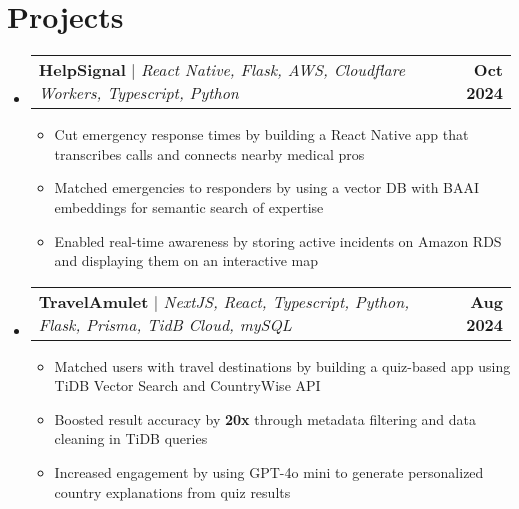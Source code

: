 \documentclass[letterpaper,11pt]{article}
\makeatletter
\newcommand{\resumeItem}[1]{
  \item\small{
    {#1 \vspace{-2pt}}
  }
}
\newcommand{\resumeProjectHeading}[2]{
    \item
    \begin{tabular*}{1.001\textwidth}{l@{\extracolsep{\fill}}r}
      \small#1 & \textbf{\small #2}\\
    \end{tabular*}\vspace{-7pt}
}
\newcommand{\resumeSubHeadingListStart}{\begin{itemize}[leftmargin=0.0in, label={}]}
\newcommand{\resumeSubHeadingListEnd}{\end{itemize}}
\newcommand{\resumeItemListStart}{\begin{itemize}}
\newcommand{\resumeItemListEnd}{\end{itemize}\vspace{-5pt}}
\makeatother
\begin{document}
\vspace{-17pt}
\section{Projects}
  \vspace{-5pt}
    \resumeSubHeadingListStart
      \resumeProjectHeading
        {\textbf{HelpSignal} $|$ \emph{React Native, Flask, AWS, Cloudflare Workers, Typescript, Python}}{Oct 2024}
        \resumeItemListStart
          \resumeItem{Cut emergency response times by building a React Native app that transcribes calls and connects nearby medical pros}
          \resumeItem{Matched emergencies to responders by using a vector DB with BAAI embeddings for semantic search of expertise}
          \resumeItem{Enabled real-time awareness by storing active incidents on Amazon RDS and displaying them on an interactive map}
        \resumeItemListEnd
      \vspace{-20pt}
    \resumeProjectHeading
        {\textbf{TravelAmulet} $|$ \emph{NextJS, React, Typescript, Python, Flask, Prisma, TidB Cloud, mySQL}}{Aug 2024}
        \resumeItemListStart
          \resumeItem{Matched users with travel destinations by building a quiz-based app using TiDB Vector Search and CountryWise API}
          \resumeItem{Boosted result accuracy by \textbf{20x} through metadata filtering and data cleaning in TiDB queries}
          \resumeItem{Increased engagement by using GPT-4o mini to generate personalized country explanations from quiz results}          
        \resumeItemListEnd
\resumeSubHeadingListEnd


\vspace{-20pt}
\end{document}
